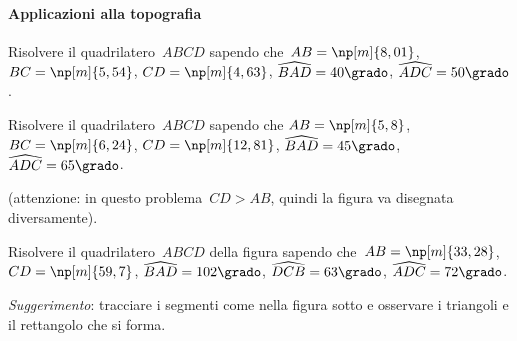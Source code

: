 \paragraph{Applicazioni alla topografia}

\begin{multicols}{2}
 \begin{esercizio}
\label{ese:C.34}
Risolvere il quadrilatero~$ABCD$ sapendo che~${AB}=\np[m]{8,01}$,
${BC}=\np[m]{5,54}$, ${CD}=\np[m]{4,63}$, $\widehat{BAD}=40\grado$, $\widehat{ADC}=50\grado$.
\end{esercizio}

\begin{esercizio}
\label{ese:C.35}
Risolvere il quadrilatero~$ABCD$ sapendo che ${AB}=\np[m]{5,8}$, ${BC}=\np[m]{6,24}$,
${CD}=\np[m]{12,81}$, $\widehat{BAD}=45\grado$, $\widehat{ADC}=65\grado$.

(attenzione: in questo problema~${CD}>{AB}$, quindi la figura va disegnata diversamente).
\end{esercizio}

 \begin{esercizio}
\label{ese:C.36}
Risolvere il quadrilatero~$ABCD$ della figura sapendo che~${AB}=\np[m]{33,28}$, ${CD}=\np[m]{59,7}$,
$\widehat{BAD}=102\grado$, $\widehat{DCB}=63\grado$, $\widehat{ADC}=72\grado$.

\emph{Suggerimento}: tracciare i segmenti come nella figura sotto e osservare i triangoli e il rettangolo che si forma.
\end{esercizio}
\begin{center}
 
\end{center}
\end{multicols}

\pagebreak

